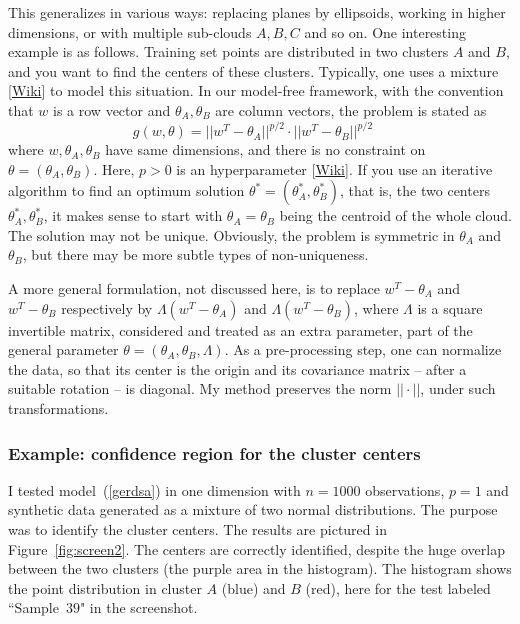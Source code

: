 \documentclass[oneside,10pt]{book}
\begin{document}
This generalizes in various ways: replacing planes by ellipsoids, working in higher dimensions, or with multiple sub-clouds
 $A, B, C$ and so on. One interesting example is as follows. Training set points are distributed in two clusters $A$ and $B$, and you want to find the centers of these clusters. Typically, one uses a \textcolor{index}{mixture} [\href{https://en.wikipedia.org/wiki/Mixture_model}{Wiki}] to model this situation.
 In our model-free framework, with the convention that $w$ is a row vector and $\theta_A,\theta_B$ are column vectors, the problem is stated as
\begin{equation}
g(w,\theta)=||w^T-\theta_A||^{p/2} \cdot ||w^T-\theta_B||^{p/2} \quad \label{gerdsa}
\end{equation}
where $w, \theta_A, \theta_B$ have same dimensions, and there is no constraint on $\theta=(\theta_A,\theta_B)$. Here, $p>0$ is an \textcolor{index}{hyperparameter} [\href{https://en.wikipedia.org/wiki/Hyperparameter_(machine_learning)}{Wiki}].
If you use an iterative algorithm to find an optimum solution $\theta^*=(\theta_A^*,\theta_B^*)$, that is, the two centers $\theta_A^*,\theta_B^*$, it makes sense to start with
 $\theta_A=\theta_B$ being the centroid of the whole cloud. The solution may not be unique. Obviously, the problem is symmetric in $\theta_A$ and
$\theta_B$, but there may be more subtle types of non-uniqueness.

A more general formulation, not discussed here, is to replace $w^T-\theta_A$ and $w^T-\theta_B$ respectively by
$\Lambda(w^T-\theta_A)$ and $\Lambda(w^T-\theta_B)$, where $\Lambda$ is a square invertible matrix, considered and treated as an extra parameter,
 part of the general parameter $\theta=(\theta_A,\theta_B,\Lambda)$. As a pre-processing step, one can normalize the data, so that its center is the origin and its covariance matrix -- after a suitable rotation -- is diagonal. My method preserves the norm $||\cdot||$, under such transformations.

\subsubsection{Example: confidence region for the cluster centers}\label{reserse}

I tested model~(\ref{gerdsa}) in one dimension with $n=1000$ observations,
 $p=1$ and \textcolor{index}{synthetic data} generated as a mixture of two normal distributions. The purpose was to identify the cluster centers. The results are pictured in Figure~\ref{fig:screen2}.  The centers are correctly identified, despite the huge overlap between the two clusters (the purple area in the histogram).
The histogram shows the point distribution in cluster $A$ (blue) and $B$ (red), here for the test labeled ``Sample~$39$" in the screenshot.
\end{document}
